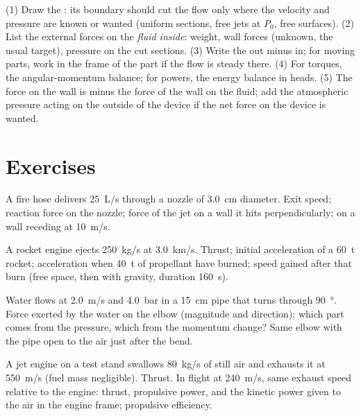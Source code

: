 \begin{method}\label{met:b2:flow-balances:method}
(1) Draw the : its boundary should cut the flow only
where the velocity and pressure are known or wanted (uniform sections,
free jets at $P_0$, free surfaces). (2) List the external forces on the
\emph{fluid inside}: weight, wall forces (unknown, the usual target),
pressure on the cut sections. (3) Write the  out minus in;
for moving parts, work in the frame of the part if the flow is steady
there. (4) For torques, the angular-momentum balance; for powers, the
energy balance in heads. (5) The force on the wall is minus the force
of the wall on the fluid; add the atmospheric pressure acting on the
outside of the device if the net force on the device is wanted.
\end{method}

\section{Exercises}

\begin{exercise}[$\star$]\label{exo:b2:flow-balances:1}
A fire hose delivers \qty{25}{L/s} through a nozzle of \qty{3.0}{cm}
diameter. Exit speed; reaction force on the nozzle; force of the jet
on a wall it hits perpendicularly; on a wall receding at \qty{10}{m/s}.
\end{exercise}

\begin{exercise}[$\star$]\label{exo:b2:flow-balances:2}
A rocket engine ejects \qty{250}{kg/s} at \qty{3.0}{km/s}. Thrust; initial
acceleration of a \qty{60}{t} rocket; acceleration when \qty{40}{t} of
propellant have burned; speed gained after that burn (free space, then
with gravity, duration \qty{160}{s}).
\end{exercise}

\begin{exercise}[$\star$]\label{exo:b2:flow-balances:3}
Water flows at \qty{2.0}{m/s} and \qty{4.0}{bar} in a \qty{15}{cm} pipe that
turns through \qty{90}{\degree}. Force exerted by the water on the elbow
(magnitude and direction); which part comes from the pressure, which
from the momentum change? Same elbow with the pipe open to the air just
after the bend.
\end{exercise}

\begin{exercise}[$\star$]\label{exo:b2:flow-balances:4}
A jet engine on a test stand swallows \qty{80}{kg/s} of still air and
exhausts it at \qty{550}{m/s} (fuel mass negligible). Thrust. In flight
at \qty{240}{m/s}, same exhaust speed relative to the engine: thrust,
propulsive power, and the kinetic power given to the air in the engine
frame; propulsive efficiency.
\end{exercise}

